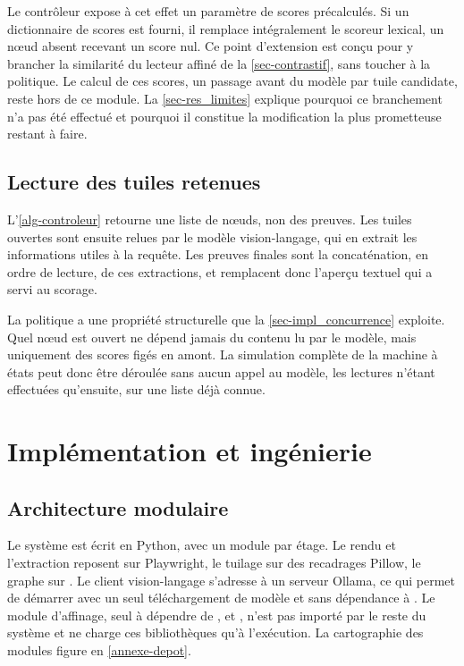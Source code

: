 Le contrôleur expose à cet effet un paramètre de scores précalculés. Si un
dictionnaire de scores est fourni, il remplace intégralement le scoreur lexical,
un nœud absent recevant un score nul. Ce point d'extension est conçu pour y
brancher la similarité du lecteur affiné de la \cref{sec-contrastif}, sans
toucher à la politique. Le calcul de ces scores, un passage avant du modèle par
tuile candidate, reste hors de ce module. La \cref{sec-res_limites} explique
pourquoi ce branchement n'a pas été effectué et pourquoi il constitue la
modification la plus prometteuse restant à faire.
 
\subsection{Lecture des tuiles retenues}
\label{sec-controleur_lecture}
 
L'\cref{alg-controleur} retourne une liste de nœuds, non des preuves. Les tuiles
ouvertes sont ensuite relues par le modèle vision-langage, qui en extrait les
informations utiles à la requête. Les preuves finales sont la concaténation, en
ordre de lecture, de ces extractions, et remplacent donc l'aperçu textuel qui a
servi au scorage.
 
La politique a une propriété structurelle que la \cref{sec-impl_concurrence}
exploite. Quel nœud est ouvert ne dépend jamais du contenu lu par le modèle, mais
uniquement des scores figés en amont. La simulation complète de la machine à
états peut donc être déroulée sans aucun appel au modèle, les lectures n'étant
effectuées qu'ensuite, sur une liste déjà connue.
 
\section{Implémentation et ingénierie}
\label{sec-implementation}
 
\subsection{Architecture modulaire}
 
Le système est écrit en Python, avec un module par étage. Le rendu et l'extraction
reposent sur Playwright, le tuilage sur des recadrages Pillow, le graphe sur
. Le client vision-langage s'adresse à un serveur Ollama, ce qui
permet de démarrer avec un seul téléchargement de modèle et sans dépendance à
. Le module d'affinage, seul à dépendre de ,
 et , n'est pas importé par le reste du système et ne
charge ces bibliothèques qu'à l'exécution. La cartographie des modules figure en
\cref{annexe-depot}.
 
